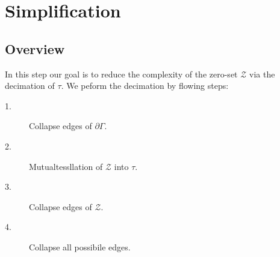 \documentclass{article}
\theoremstyle{definition}
\theoremstyle{remark}
\begin{document}
\section{Simplification}
\subsection{Overview}
In this step our goal is to reduce the complexity of the zero-set $\mathcal{Z}$ via the decimation of $\tau$. We peform the decimation by flowing steps:
\begin{description}
  \item[1.] Collapse edges of $\partial \Gamma$.
  \item[2.] Mutualtessllation of $\mathcal{Z}$ into $\tau$.
  \item[3.] Collapse edges of $\mathcal{Z}$.
  \item[4.] Collapse all possibile edges.
\end{description}
\end{document}
